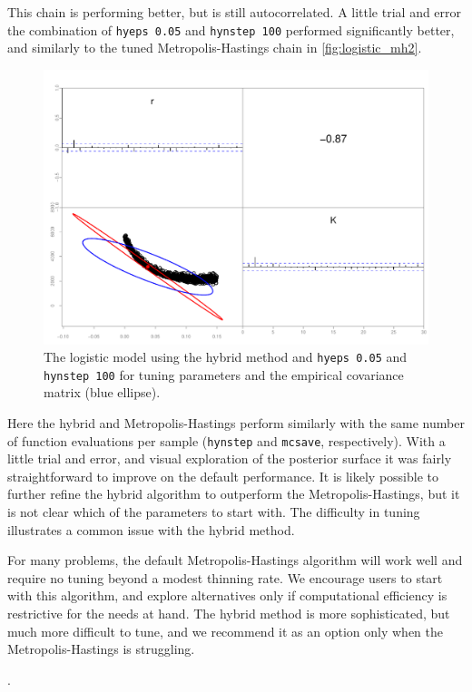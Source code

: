 \documentclass{article}\usepackage[]{graphicx}\usepackage[]{color}
\begin{document}
This chain is performing better, but is still
autocorrelated. A little trial and error the combination of
\texttt{hyeps 0.05} and \texttt{hynstep 100} performed
significantly better, and similarly to the tuned Metropolis-Hastings chain in
\ref{fig:logistic_mh2}.
\begin{figure}[H]
  \centering
  \includegraphics[width=5in]{../plots/logistic_hy3.pdf}
  \caption{The logistic model using the hybrid method and
    \texttt{hyeps 0.05} and \texttt{hynstep 100} for tuning
    parameters and the empirical covariance matrix (blue
    ellipse).}
  \label{fig:logistic_hy3}
\end{figure}

Here the hybrid and Metropolis-Hastings perform similarly with the same
number of function evaluations per sample (\texttt{hynstep}
and \texttt{mcsave}, respectively). With a little trial and
error, and visual exploration of the posterior surface it
was fairly straightforward to improve on the default
performance. It is likely possible to further refine the
hybrid algorithm to outperform the Metropolis-Hastings, but it is not clear
which of the parameters to start with. The difficulty in
tuning illustrates a common issue with the hybrid method.

For many problems, the default Metropolis-Hastings algorithm will work well
and require no tuning beyond a modest thinning rate. We
encourage users to start with this algorithm, and explore
alternatives only if computational efficiency is restrictive
for the needs at hand. The hybrid method is more
sophisticated, but much more difficult to tune, and we
recommend it as an option only when the Metropolis-Hastings is struggling.


.
\end{document}
